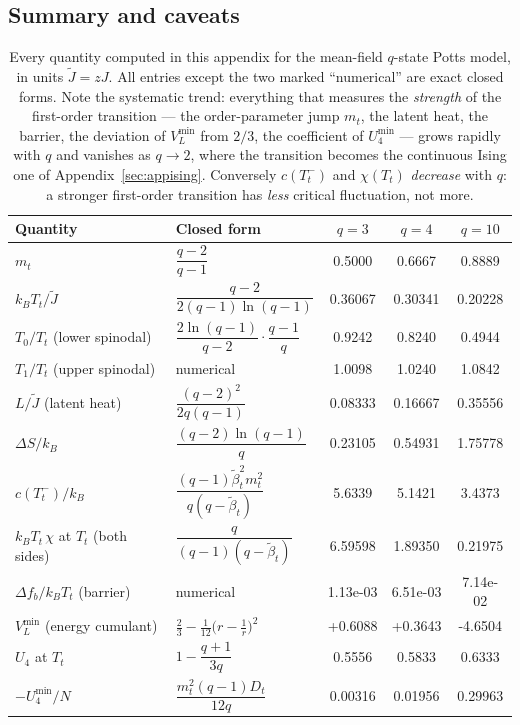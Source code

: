 \documentclass[10pt,a4paper]{article}
\theoremstyle{remark}
\begin{document}
\subsection{Summary and caveats}
\label{sec:apppotts:summary}

\begin{table}[htbp]
\centering
\renewcommand{\arraystretch}{1.35}\small
\begin{tabular}{@{}llccc@{}}
\toprule
Quantity & Closed form & $q=3$ & $q=4$ & $q=10$\\
\midrule
$m_t$ & $\dfrac{q-2}{q-1}$ & 0.5000 & 0.6667 & 0.8889\\
$k_BT_t/\tilde J$ & $\dfrac{q-2}{2(q-1)\ln(q-1)}$ & 0.36067 & 0.30341 & 0.20228\\
$T_0/T_t$ (lower spinodal) & $\dfrac{2\ln(q-1)}{q-2}\cdot\dfrac{q-1}{q}$ & 0.9242 & 0.8240 & 0.4944\\
$T_1/T_t$ (upper spinodal) & numerical & 1.0098 & 1.0240 & 1.0842\\
$L/\tilde J$ (latent heat) & $\dfrac{(q-2)^{2}}{2q(q-1)}$ & 0.08333 & 0.16667 & 0.35556\\
$\Delta S/k_B$ & $\dfrac{(q-2)\ln(q-1)}{q}$ & 0.23105 & 0.54931 & 1.75778\\
$c(T_t^{-})/k_B$ & $\dfrac{(q-1)\tilde\beta_t^{2}m_t^{2}}{q(q-\tilde\beta_t)}$ & 5.6339 & 5.1421 & 3.4373\\
$k_BT_t\,\chi$ at $T_t$ (both sides) & $\dfrac{q}{(q-1)(q-\tilde\beta_t)}$ & 6.59598 & 1.89350 & 0.21975\\
$\Delta f_b/k_BT_t$ (barrier) & numerical & 1.13e-03 & 6.51e-03 & 7.14e-02\\
$V_L^{\min}$ (energy cumulant) & $\tfrac23-\tfrac1{12}\big(r-\tfrac1r\big)^{2}$ & +0.6088 & +0.3643 & -4.6504\\
$U_4$ at $T_t$ & $1-\dfrac{q+1}{3q}$ & 0.5556 & 0.5833 & 0.6333\\
$-U_4^{\min}/N$ & $\dfrac{m_t^{2}(q-1)D_t}{12q}$ & 0.00316 & 0.01956 & 0.29963\\
\bottomrule
\end{tabular}
\caption{Every quantity computed in this appendix for the mean-field $q$-state
Potts model, in units $\tilde J=zJ$. All entries except the two marked
``numerical'' are exact closed forms. Note the systematic trend: everything that
measures the \emph{strength} of the first-order transition --- the
order-parameter jump $m_t$, the latent heat, the barrier, the deviation of
$V_L^{\min}$ from $2/3$, the coefficient of $U_4^{\min}$ --- grows rapidly with
$q$ and vanishes as $q\to2$, where the transition becomes the continuous Ising
one of Appendix~\ref{sec:appising}. Conversely $c(T_t^-)$ and $\chi(T_t)$
\emph{decrease} with $q$: a stronger first-order transition has \emph{less}
critical fluctuation, not more.}
\label{tab:apppotts}
\end{table}
\end{document}
